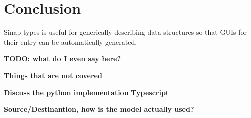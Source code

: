 \documentclass{article}
\begin{document}
\section{Conclusion}
Sinap types is useful for generically describing data-structures 
so that GUIs for their entry can be automatically generated. 

\textbf{TODO: what do I even say here?}

\textbf{Things that are not covered}

\textbf{Discuss the python implementation}
\textbf{Typescript}

\textbf{Source/Destinantion, how is the model actually used?}
\end{document}
